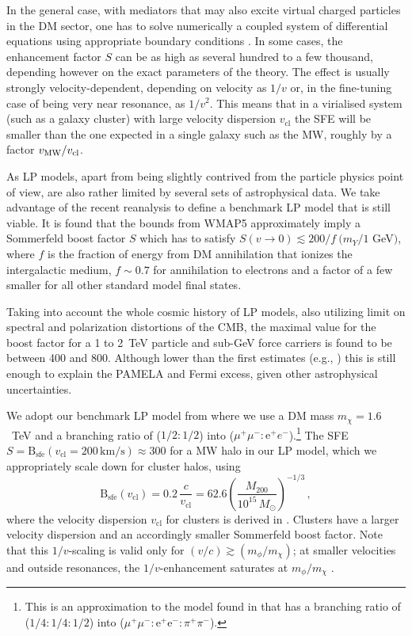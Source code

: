 \documentclass[10pt,aps,pra,reprint,amsmath,amsfonts,amssymb,showpacs,nofootinbib,floatfix]{revtex4-1}
\newcommand{\rmn}{\mathrm}
\newcommand{\sfe}{\rmn{sfe}}
\newcommand{\msun}{M_\odot}
\newcommand{\B}{\rmn{B}}
\newcommand{\sigv}{v_\rmn{cl}}
\newcommand{\mvir}{M_{200}}
\newcommand{\e}{\rmn{e}}
\begin{document}
In the general case, with mediators that may also excite virtual
charged particles in the DM sector, one has to solve numerically a
coupled system of differential equations using appropriate boundary
conditions
\cite{2005PhRvD..71f3528H,2007NuPhB.787..152C,2009PhRvD..79a5014A}. In
some cases, the enhancement factor $S$ can be as high as several
hundred to a few thousand, depending however on the exact parameters
of the theory. The effect is usually strongly velocity-dependent,
depending on velocity as $1/v$ or, in the fine-tuning case of being
very near resonance, as $1/v^2$. This means that in a virialised
system (such as a galaxy cluster) with large velocity dispersion
$\sigv$ the SFE will be smaller than the one expected in a single
galaxy such as the MW, roughly by a factor $v_{\rm MW}/\sigv$.


As LP models, apart from being slightly contrived from the
particle physics point of view, are also rather limited by several
sets of astrophysical data. We take advantage of the recent reanalysis
\cite{Finkbeiner:2010sm} to define a benchmark LP model that
is still viable.  It is found that the bounds from WMAP5 approximately
imply a Sommerfeld boost factor $S$ which has to satisfy $S(v\to
0)\lesssim 200/f\ (m_Y/1$ GeV$)$, where $f$ is the fraction of energy
from DM annihilation that ionizes the intergalactic medium,
$f\sim 0.7$ for annihilation to electrons and a factor of a few smaller
for all other standard model final states.

Taking into account the whole cosmic history of LP models, also
utilizing limit on spectral and polarization distortions of the CMB,
the maximal value for the boost factor for a 1 to 2~TeV particle and
sub-GeV force carriers is found to be \cite{Finkbeiner:2010sm} between
400 and 800. Although lower than the first estimates (e.g.,
\cite{Bergstrom:2009fa,Meade:2009iu}) this is still enough to explain
the PAMELA and Fermi excess, given other astrophysical uncertainties.

We adopt our benchmark LP model from \cite{Finkbeiner:2010sm} where we
use a DM mass $m_\chi=1.6$~TeV and a branching ratio of ($1/2:1/2$)
into ($\mu^+\mu^-:\e^+e^-$).\footnote{This is an approximation to the
  model found in \cite{Finkbeiner:2010sm} that has a branching ratio
  of ($1/4:1/4:1/2$) into ($\mu^+\mu^-:\e^+\e^-:\pi^+\pi^-$).}  The
SFE $S=\B_\sfe(\sigv=200\,\rmn{km}/\rmn{s})\approx 300$ for a MW halo
in our LP model, which we appropriately scale down for cluster halos,
using
\begin{equation}
\B_\sfe(\sigv) = 0.2\, \frac{c}{\sigv} = 
62.6 \left(\frac{\mvir}{10^{15}\,\msun}\right)^{-1/3}\,,
\label{eq:B_sfe}
\end{equation}
where the velocity dispersion $\sigv$ for clusters is derived in
\cite{2005RvMP...77..207V}. Clusters have a larger velocity dispersion
and an accordingly smaller Sommerfeld boost factor. Note that this
$1/v$-scaling is valid only for $(v/c) \gtrsim (m_\phi/m_\chi)$; at
smaller velocities and outside resonances, the $1/v$-enhancement
saturates at $m_\phi/m_\chi$ \cite{2008PhRvL.101z1301K}.
\end{document}
